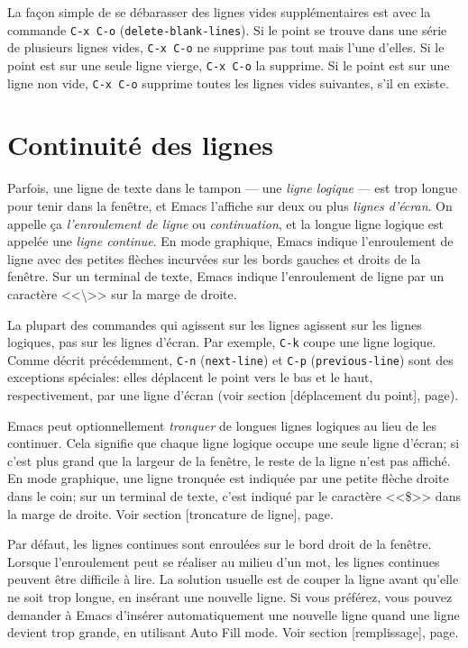 La façon simple de se débarasser des lignes vides supplémentaires est
avec la commande \texttt{C-x C-o} (\texttt{delete-blank-lines}). Si le
point se trouve dans une série de plusieurs lignes vides, \texttt{C-x
  C-o} ne supprime pas tout mais l'une d'elles. Si le point est sur une seule
ligne vierge, \texttt{C-x C-o} la supprime. Si le point est sur une
ligne non vide, \texttt{C-x C-o} supprime toutes les lignes vides
suivantes, s'il en existe.\par

\section{Continuité des lignes}

Parfois, une ligne de texte dans le tampon  --- une \emph{ligne
  logique}  --- est trop longue pour tenir dans la fenêtre, et Emacs
l'affiche sur deux ou plus \emph{lignes d'écran}. On appelle ça
\emph{l'enroulement de ligne} ou \emph{continuation}, et la longue
ligne logique est appelée une \emph{ligne continue}. En mode
graphique, Emacs indique l'enroulement de ligne avec des petites
flèches incurvées sur les bords gauches et droits de la fenêtre. Sur
un terminal de texte, Emacs indique l'enroulement de ligne par un caractère
<<\textbackslash>> sur la marge de droite. \par

La plupart des commandes qui agissent sur les lignes agissent sur les
lignes logiques, pas sur les lignes d'écran. Par exemple, \texttt{C-k}
coupe une ligne logique. Comme décrit précédemment, \texttt{C-n}
(\texttt{next-line}) et \texttt{C-p} (\texttt{previous-line}) sont des
exceptions spéciales: elles déplacent le point vers le bas et le haut,
respectivement, par une ligne d'écran (voir section
[déplacement du point], page).\par 

Emacs peut optionnellement \emph{tronquer} de longues lignes logiques
au lieu de les continuer. Cela signifie que chaque ligne logique
occupe une seule ligne d'écran; si c'est plus grand que la largeur de
la fenêtre, le reste de la ligne n'est pas affiché. En mode graphique,
une ligne tronquée est indiquée par une petite flèche droite dans le
coin; sur un terminal de texte, c'est indiqué par le caractère <<\$>>
dans la marge de droite. Voir section [troncature de
ligne], page.\par

Par défaut, les lignes continues sont enroulées sur le bord droit de
la fenêtre. Lorsque l'enroulement peut se réaliser au milieu d'un mot,
les lignes continues peuvent être difficile à lire. La solution
usuelle est de couper la ligne avant qu'elle ne soit trop longue, en
insérant une nouvelle ligne. Si vous préférez, vous pouvez demander à
Emacs d'insérer automatiquement une nouvelle ligne quand une ligne
devient trop grande, en utilisant Auto Fill mode. Voir
section [remplissage], page.\par

